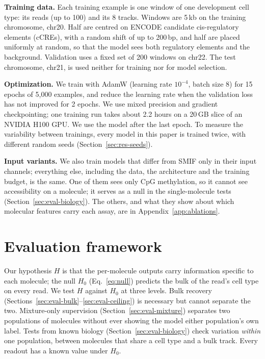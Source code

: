 \documentclass[acmtog,nonacm]{acmart}   %
\begin{document}
\textbf{Training data.} Each training example is one window of one development cell type: its reads (up to 100)
and its 8 tracks. Windows are 5\,kb on the training chromosome, chr20. Half are centred on ENCODE candidate
cis-regulatory elements (cCREs), with a random shift of up to 200\,bp, and half are placed uniformly at random, so
that the model sees both regulatory elements and the background. Validation uses a fixed set of 200 windows on
chr22. The test chromosome, chr21, is used neither for training nor for model selection.

\textbf{Optimization.} We train with AdamW (learning rate $10^{-4}$, batch size 8) for 15 epochs of 5,000 examples,
and reduce the learning rate when the validation loss has not improved for 2 epochs. We use mixed precision and
gradient checkpointing; one training run takes about 2.2 hours on a 20\,GB slice of an NVIDIA H100 GPU. We use the
model after the last epoch. To measure the variability between trainings, every model in this paper is trained
twice, with different random seeds (Section~\ref{sec:res-seeds}).

\textbf{Input variants.} We also train models that differ from SMIF only in their input channels; everything else,
including the data, the architecture and the training budget, is the same. One of them sees only CpG methylation,
so it cannot see accessibility on a molecule; it serves as a null in the single-molecule tests
(Section~\ref{sec:eval-biology}). The others, and what they show about which molecular features carry each assay,
are in Appendix~\ref{app:ablations}.

\section{Evaluation framework}
\label{sec:evaluation}

Our hypothesis $H$ is that the per-molecule outputs carry information specific to each molecule; the null
$H_0$ (Eq.~\ref{eq:null}) predicts the bulk of the read's cell type on every read. We test $H$ against $H_0$ at
three levels. Bulk recovery (Sections~\ref{sec:eval-bulk}--\ref{sec:eval-ceiling}) is necessary but cannot
separate the two. Mixture-only supervision (Section~\ref{sec:eval-mixture}) separates two populations of molecules
without ever showing the model either population's own label. Tests from known biology
(Section~\ref{sec:eval-biology}) check variation \emph{within} one population, between molecules that share a
cell type and a bulk track. Every readout has a known value under $H_0$.
\end{document}
